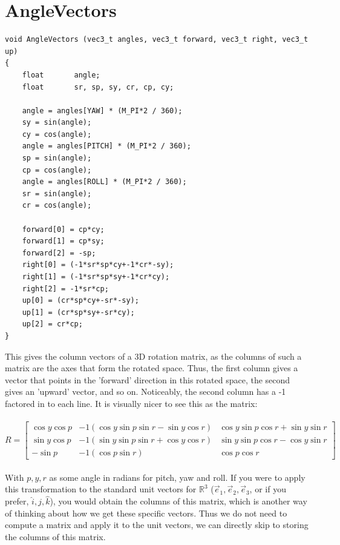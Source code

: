 \documentclass{article}
\begin{document}
\section{AngleVectors}
\begin{verbatim}
void AngleVectors (vec3_t angles, vec3_t forward, vec3_t right, vec3_t up)
{
	float		angle;
	float		sr, sp, sy, cr, cp, cy;
	
	angle = angles[YAW] * (M_PI*2 / 360);
	sy = sin(angle);
	cy = cos(angle);
	angle = angles[PITCH] * (M_PI*2 / 360);
	sp = sin(angle);
	cp = cos(angle);
	angle = angles[ROLL] * (M_PI*2 / 360);
	sr = sin(angle);
	cr = cos(angle);

	forward[0] = cp*cy;
	forward[1] = cp*sy;
	forward[2] = -sp;
	right[0] = (-1*sr*sp*cy+-1*cr*-sy);
	right[1] = (-1*sr*sp*sy+-1*cr*cy);
	right[2] = -1*sr*cp;
	up[0] = (cr*sp*cy+-sr*-sy);
	up[1] = (cr*sp*sy+-sr*cy);
	up[2] = cr*cp;
}
\end{verbatim}
This gives the column vectors of a 3D rotation matrix, as the columns of such a matrix are the axes that form the rotated space. Thus, the first column gives a vector that points in the 'forward' direction in this rotated space, the second gives an 'upward' vector, and so on. Noticeably, the second column has a -1 factored in to each line. It is visually nicer to see this as the matrix: \\
\\
$R = \begin{bmatrix}
    \cos{y}\cos{p} & -1(\cos{y}\sin{p}\sin{r}-\sin{y}\cos{r}) & \cos{y}\sin{p}\cos{r}+\sin{y}\sin{r} \\

    \sin{y}\cos{p} &  -1(\sin{y}\sin{p}\sin{r}+\cos{y}\cos{r}) & \sin{y}\sin{p}\cos{r}-\cos{y}\sin{r} \\

    -\sin{p} & -1(\cos{p}\sin{r}) & \cos{p}\cos{r}
\end{bmatrix}$\\
\\
With $p,y,r$ as some angle in radians for pitch, yaw and roll. If you were to apply this transformation to the standard unit vectors for $\mathbb{R}^3$ ($\vec{e}_1,\vec{e}_2,\vec{e}_3$, or if you prefer, $\hat{i},\hat{j},\hat{k}$), you would obtain the columns of this matrix, which is another way of thinking about how we get these specific vectors. Thus we do not need to compute a matrix and apply it to the unit vectors, we can directly skip to storing the columns of this matrix.
\newpage
\end{document}
